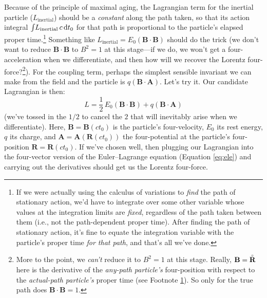 \documentclass[12pt]{article}
\renewcommand{\mathring}[1]{\accentset{\circ}{#1}}
\renewcommand{\vv}[1]{\mathbf{#1}}
\newcommand{\dd}[1]{\mathrm{d}#1}
\begin{document}
Because of the principle of maximal aging, the Lagrangian term for the inertial particle ($L_{\textrm{inertial}}$) should be a \emph{constant} along the path taken, so that its action integral $\int \mkern-4mu L_{\textrm{inertial}} \, c \, \dd t_0$ for that path is proportional to the particle's elapsed proper time.\footnote{\label{fn:covpt}If we were actually using the calculus of variations to \emph{find} the path of stationary action, we'd have to integrate over some other variable whose values at the integration limits are \emph{fixed}, regardless of the path taken between them (i.e., not the path-dependent proper time). After finding the path of stationary action, it's fine to equate the integration variable with the particle's proper time \emph{for that path}, and that's all we've done.} Something like $L_{\textrm{inertial}} = E_0 (\vv B \cdot \vv B)$ should do the trick (we don't want to reduce $\vv B \cdot \vv B$ to $B^2 = 1$ at this stage---if we do, we won't get a four-acceleration when we differentiate, and then how will we recover the Lorentz four-force?\footnote{\label{fn:bb1}More to the point, we \emph{can't} reduce it to $B^2 = 1$ at this stage. Really, $\vv B = \mathring{\vv R}$ here is the derivative of the \emph{any-path particle's} four-position with respect to the \emph{actual-path particle's} proper time (see Footnote \ref{fn:covpt}). So only for the true path does $\vv B \cdot \vv B = 1$.}). For the coupling term, perhaps the simplest sensible invariant we can make from the field and the particle is $q (\vv B \cdot \vv A)$. Let's try it. Our candidate Lagrangian is then:
\begin{equation*}
L = \dfrac{1}{2} \, E_0 (\vv B \cdot \vv B) + q (\vv B \cdot \vv A)
\end{equation*}
(we've tossed in the $1/2$ to cancel the $2$ that will inevitably arise when we differentiate). Here, $\vv B = \vv B (ct_0)$ is the particle's four-velocity, $E_0$ its rest energy, $q$ its charge, and $\vv A = \vv A (\vv R (ct_0))$ the four-potential at the particle's four-position $\vv R = \vv R (ct_0)$. If we've chosen well, then plugging our Lagrangian into the four-vector version of the Euler--Lagrange equation (Equation \ref{eq:ele}) and carrying out the derivatives should get us the Lorentz four-force.
\end{document}
